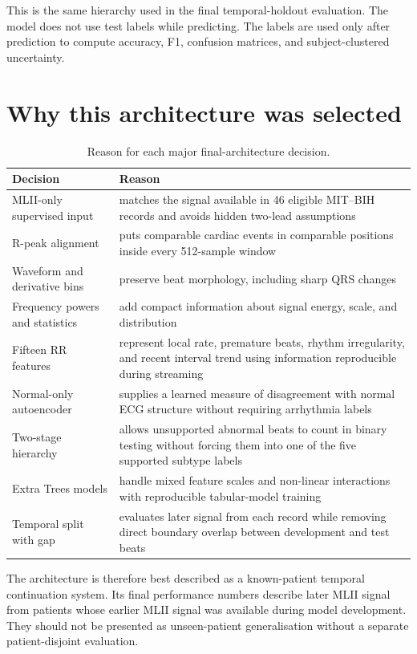 This is the same hierarchy used in the final temporal-holdout evaluation. The
model does not use test labels while predicting. The labels are used only after
prediction to compute accuracy, F1, confusion matrices, and subject-clustered
uncertainty.

\section{Why this architecture was selected}

\begin{table}[H]
\centering
\caption{Reason for each major final-architecture decision.}
\label{tab:final-design-rationale}
\begin{tabular}{>{\raggedright\arraybackslash}p{3.6cm}>{\raggedright\arraybackslash}p{9.6cm}}
\toprule
Decision & Reason\\
\midrule
MLII-only supervised input & matches the signal available in 46 eligible
MIT--BIH records and avoids hidden two-lead assumptions\\
R-peak alignment & puts comparable cardiac events in comparable positions
inside every 512-sample window\\
Waveform and derivative bins & preserve beat morphology, including sharp QRS
changes\\
Frequency powers and statistics & add compact information about signal energy,
scale, and distribution\\
Fifteen RR features & represent local rate, premature beats, rhythm
irregularity, and recent interval trend using information reproducible during
streaming\\
Normal-only autoencoder & supplies a learned measure of disagreement with
normal ECG structure without requiring arrhythmia labels\\
Two-stage hierarchy & allows unsupported abnormal beats to count in binary
testing without forcing them into one of the five supported subtype labels\\
Extra Trees models & handle mixed feature scales and non-linear interactions
with reproducible tabular-model training\\
Temporal split with gap & evaluates later signal from each record while
removing direct boundary overlap between development and test beats\\
\bottomrule
\end{tabular}
\end{table}

The architecture is therefore best described as a known-patient temporal
continuation system. Its final performance numbers describe later MLII signal
from patients whose earlier MLII signal was available during model development.
They should not be presented as unseen-patient generalisation without a
separate patient-disjoint evaluation.
